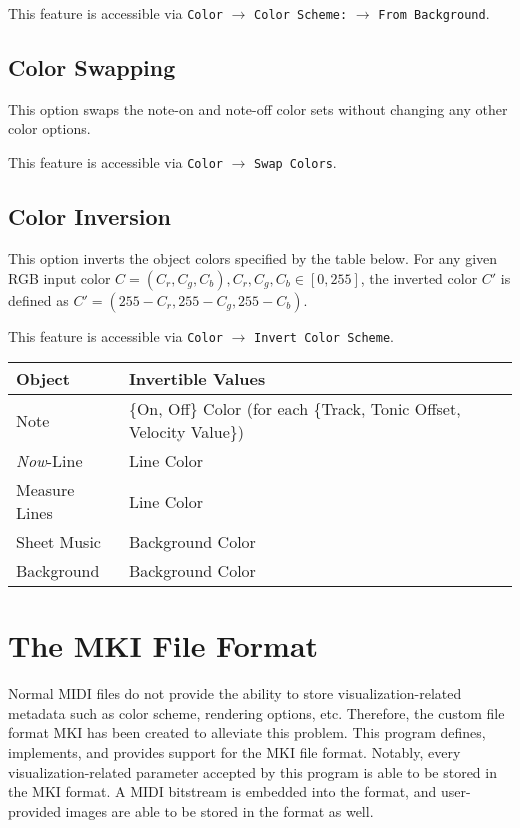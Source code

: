 \documentclass[english]{article}
\makeatletter
\newenvironment{restoretext}%
    {\@parboxrestore%
     \begin{adjustwidth}{}{\leftmargin}%
    }{\end{adjustwidth}
     }
\def\rcbegin{\begin{restoretext}\centering}
\def\rcend{\end{restoretext}}
\providecommand{\mi}[1]{\texttt{#1}}
\makeatother
\begin{document}
This feature is accessible via 
\mi{Color} $\rightarrow$ \mi{Color Scheme:} $\rightarrow$ \mi{From Background}.

\subsection{Color Swapping}

This option swaps the note-on and note-off color sets without changing any other color options.

This feature is accessible via 
\mi{Color} $\rightarrow$ \mi{Swap Colors}.

\subsection{Color Inversion}

This option inverts the object colors specified by the table below. For any given RGB input color 
$C= (C_r,C_g,C_b), C_r,C_g,C_b \in [0,255]$, the inverted color $C'$ is defined as 
$C' = (255-C_r, 255-C_g, 255-C_b)$.

This feature is accessible via 
\mi{Color} $\rightarrow$ \mi{Invert Color Scheme}.

\vspace{1em}

\rcbegin
\begin{tabular}{|l|l|}
  \hline
  \textbf{Object}         & \textbf{Invertible Values} \\
  \hline
  Note                    & \{On, Off\} Color (for each \{Track, Tonic Offset, Velocity Value\})\\
  \textit{Now}-Line       & Line Color \\
  Measure Lines           & Line Color \\
  Sheet Music             & Background Color \\
  Background              & Background Color \\
  \hline
\end{tabular}
\rcend

\section{The MKI File Format}

Normal MIDI files do not provide the ability to store visualization-related metadata such as color scheme,
rendering options, etc. Therefore, the custom file format MKI has been created to alleviate this problem.
This program defines, implements, and provides support for the MKI file format. Notably, every visualization-related
parameter accepted by this program is able to be stored in the MKI format. A MIDI bitstream is embedded into the format,
and user-provided images are able to be stored in the format as well.
\end{document}
